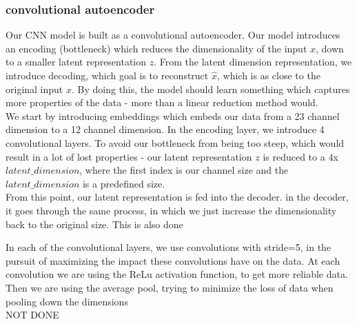 \subsubsection{convolutional autoencoder}

Our CNN model is built as a convolutional autoencoder. Our model introduces an encoding (bottleneck) which reduces the dimensionality of the input $x$, down to a smaller latent representation $z$. From the latent dimension representation, we introduce decoding, which goal is to reconstruct $\hat{x}$, which is as close to the original input $x$. By doing this, the model should learn something which captures more properties of the data - more than a linear reduction method would. \\

We start by introducing embeddings which embeds our data from a 23 channel dimension to a 12 channel dimension. In the encoding layer, we introduce 4 convolutional layers. To avoid our bottleneck from being too steep, which would result in a lot of lost properties - our latent representation $z$ is reduced to a $4$x$latent\_dimension$, where the first index is our channel size and the $latent\_dimension$ is a predefined size.\\

\noindent
From this point, our latent representation is fed into the decoder. in the decoder, it goes through the same process, in which we just increase the dimensionality back to the original size. This is also done

\noindent
In each of the convolutional layers, we use convolutions with stride=5, in the pursuit of maximizing the impact these convolutions have on the data. At each convolution we are using the ReLu activation function, to get more reliable data. Then we are using the average pool, trying to minimize the loss of data when pooling down the dimensions\\


NOT DONE

